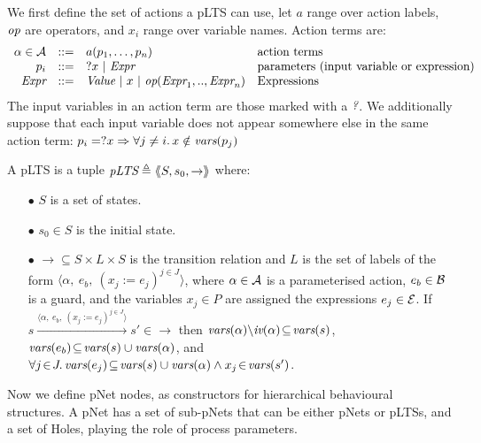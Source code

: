 \documentclass{lncs/llncs}
\begin{document}
We first define the set of actions a pLTS can use, let $a$
range over action labels, $\symb{op}$ are operators, and $x_i$ range over
variable names. Action terms are:
\[
\begin{array}[l]{rcl@{\quad}p{5.5cm}}
  \alpha\in\AlgA&::=&a(p_1,\ldots,p_n)&\text{action terms}\\
  p_i&::=& ?x~|~\symb{Expr}&\text{parameters (input variable or expression)}\\
  \symb{Expr}&::=& \symb{Value}~|~x~|~\symb{op}(\symb{Expr}_1,..,\symb{Expr}_n)&\text{Expressions}
\end{array}
\]
The input variables in an action term are those marked with a
$\symb{?}$.
We additionally suppose that each input variable does not
appear somewhere else in the same action term:
$p_i=?x\Rightarrow\forall j\neq i.\, x\notin \vars(p_j)$

\begin{definition}[pLTS]
\label{pLTS}
A pLTS is a tuple
$\pLTS\triangleq\mylangle S,s_0, \to\myrangle$ where:
\begin{itemize}
\item[$\bullet$]
$S$ is a set of states.
\item[$\bullet$]
$s_0 \in S$ is the initial state.
\item[$\bullet$] $\to \subseteq S \times L \times S$ is the transition relation and 
$L$ is the set of labels of the form
$\langle \alpha,~e_b,~(x_j\!:= {e}_j)^{j\in J}\rangle$,
where $\alpha \in\mathcal{A}$ is a parameterised action, $e_b \in
\mathcal{B}$ is a guard, and the variables $x_j\in P$
are assigned the expressions $e_j\in \mathcal{E}$.
If 
$s \xrightarrow{\langle \alpha,~e_b,~(x_j\!:= {e}_j)^{j\in
		J}\rangle} s'\in \to $ then 
		$\vars(\alpha)\backslash \iv(\alpha)\!\subseteq\! \vars(s)$, 
		$\vars(e_b)\!\subseteq\! \vars(s)\cup\vars(\alpha)$, and
		$\forall j\!\in\! J .\,\vars(e_j)\!\subseteq\! \vars(s)\cup\vars(\alpha)\land 
		x_j\!\in\!\vars(s')$. %
\end{itemize}
\end{definition}

Now we define
pNet nodes, as constructors for hierarchical behavioural structures.
A pNet has a set of sub-pNets that can be either pNets or pLTSs, and a
set of Holes, playing the role of process parameters.
\end{document}
